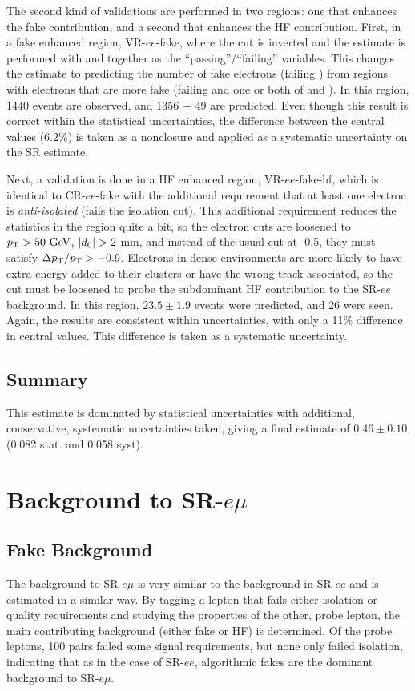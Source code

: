The second kind of validations are performed in two regions: one that enhances the fake contribution, and a second that enhances the \ac{HF} contribution. First, in a fake enhanced region, VR-$ee$-fake, where the \dpt cut is inverted and the estimate is performed with \chiID and \nmiss together as the ``passing''/``failing'' variables. This changes the estimate to predicting the number of fake electrons (failing \dpt) from regions with electrons that are more fake (failing \dpt and one or both of \chiID and \nmiss). In this region, 1440 events are observed, and 1356 $\pm$ 49 are predicted. Even though this result is correct within the statistical uncertainties, the difference between the central values (6.2\%) is taken as a nonclosure and applied as a systematic uncertainty on the \ac{SR} estimate.

Next, a validation is done in a \ac{HF} enhanced region, VR-$ee$-fake-hf, which is identical to CR-$ee$-fake with the additional requirement that at least one electron is \emph{anti-isolated} (fails the isolation cut). This additional requirement reduces the statistics in the region quite a bit, so the electron cuts are loosened to $\pt>50\gev$, $|d_0| > 2$ mm, and instead of the usual \dpt cut at -0.5, they must satisfy $\Delta p_{\text{T}}/p_{\text{T}}>-0.9$. Electrons in dense environments are more likely to have extra energy added to their clusters or have the wrong track associated, so the \dpt cut must be loosened to probe the subdominant \ac{HF} contribution to the SR-$ee$ background. In this region, $23.5\pm1.9$ events were predicted, and 26 were seen. Again, the results are consistent within uncertainties, with only a 11\% difference in central values. This difference is taken as a systematic uncertainty.

\subsection{Summary}

This estimate is dominated by statistical uncertainties with additional, conservative, systematic uncertainties taken, giving a final estimate of $0.46 \pm 0.10$ (0.082 stat. and 0.058 syst).


\section{Background to SR-$e\mu$}

\subsection{Fake Background}
The background to SR-$e\mu$ is very similar to the background in SR-$ee$ and is estimated in a similar way. By tagging a lepton that fails either isolation or quality requirements and studying the properties of the other, probe lepton, the main contributing background (either fake or \ac{HF}) is determined. Of the probe leptons, 100 pairs failed some signal requirements, but none only failed isolation, indicating that as in the case of SR-$ee$, algorithmic fakes are the dominant background to SR-$e\mu$. 

